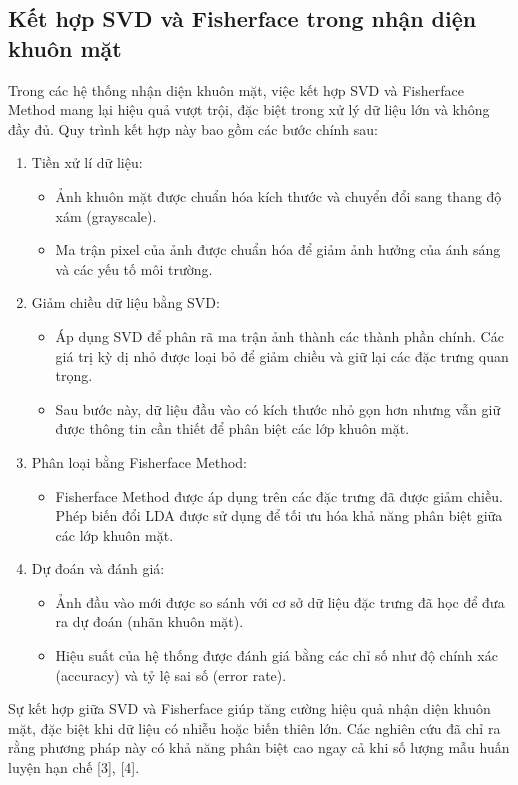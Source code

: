 \documentclass[a4paper,12pt]{extarticle}
\begin{document}
\subsection{Kết hợp SVD và Fisherface trong nhận diện khuôn mặt}
Trong các hệ thống nhận diện khuôn mặt, việc kết hợp SVD và Fisherface Method mang lại hiệu quả vượt trội, đặc biệt trong xử lý dữ liệu lớn và không đầy đủ. Quy trình kết hợp này bao gồm các bước chính sau:
\begin{enumerate}
    \item Tiền xử lí dữ liệu:
    \begin{itemize}
        \item Ảnh khuôn mặt được chuẩn hóa kích thước và chuyển đổi sang thang độ xám
        (grayscale).
        \item Ma trận pixel của ảnh được chuẩn hóa để giảm ảnh hưởng của ánh sáng và các yếu tố
        môi trường.
    \end{itemize}
    \item Giảm chiều dữ liệu bằng SVD:
    \begin{itemize}
        \item Áp dụng SVD để phân rã ma trận ảnh thành các thành phần chính. Các giá trị kỳ dị nhỏ được loại bỏ để giảm chiều và giữ lại các đặc trưng quan trọng.
        \item Sau bước này, dữ liệu đầu vào có kích thước nhỏ gọn hơn nhưng vẫn giữ được thông tin cần thiết để phân biệt các lớp khuôn mặt.
    \end{itemize}
    \item Phân loại bằng Fisherface Method:
    \begin{itemize}
        \item Fisherface Method được áp dụng trên các đặc trưng đã được giảm chiều. Phép biến đổi
        LDA được sử dụng để tối ưu hóa khả năng phân biệt giữa các lớp khuôn mặt.
    \end{itemize}
    \item Dự đoán và đánh giá:
    \begin{itemize}
        \item Ảnh đầu vào mới được so sánh với cơ sở dữ liệu đặc trưng đã học để đưa ra dự đoán (nhãn khuôn mặt). 
        \item Hiệu suất của hệ thống được đánh giá bằng các chỉ số như độ chính xác (accuracy) và tỷ lệ sai số (error rate).
    \end{itemize}
\end{enumerate}
Sự kết hợp giữa SVD và Fisherface giúp tăng cường hiệu quả nhận diện khuôn mặt, đặc biệt khi dữ liệu có nhiễu hoặc biến thiên lớn. Các nghiên cứu đã chỉ ra rằng phương pháp này có khả năng phân biệt cao ngay cả khi số lượng mẫu huấn luyện hạn chế [3], [4].
\end{document}
